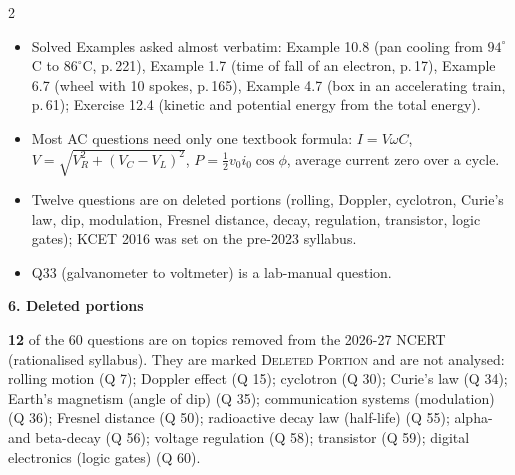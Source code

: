 \begin{multicols}{2}
{\begin{itemize}[leftmargin=1em,nosep]
\item Solved Examples asked almost verbatim: Example 10.8 (pan cooling from $94^\circ$C to $86^\circ$C, p.\,221), Example 1.7 (time of fall of an electron, p.\,17), Example 6.7 (wheel with 10 spokes, p.\,165), Example 4.7 (box in an accelerating train, p.\,61); Exercise 12.4 (kinetic and potential energy from the total energy).
\item Most AC questions need only one textbook formula: $I=V\omega C$, $V=\sqrt{V_R^2+(V_C-V_L)^2}$, $P=\tfrac12v_0i_0\cos\phi$, average current zero over a cycle.
\item Twelve questions are on deleted portions (rolling, Doppler, cyclotron, Curie's law, dip, modulation, Fresnel distance, decay, regulation, transistor, logic gates); KCET 2016 was set on the pre-2023 syllabus.
\item Q33 (galvanometer to voltmeter) is a lab-manual question.
\end{itemize}}\par\medskip
\textbf{\color{crimson}6. Deleted portions}\par\smallskip
\textbf{12} of the 60 questions are on topics removed from the 2026-27 NCERT (rationalised syllabus). They are marked \textsc{Deleted Portion} and are not analysed: rolling motion (Q 7); Doppler effect (Q 15); cyclotron (Q 30); Curie's law (Q 34); Earth's magnetism (angle of dip) (Q 35); communication systems (modulation) (Q 36); Fresnel distance (Q 50); radioactive decay law (half-life) (Q 55); alpha- and beta-decay (Q 56); voltage regulation (Q 58); transistor (Q 59); digital electronics (logic gates) (Q 60).\par
\end{multicols}







